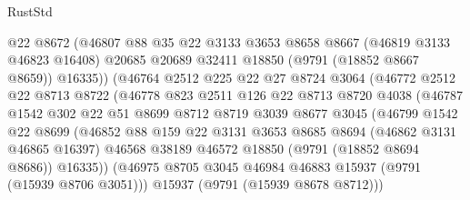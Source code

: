 \begin{lexlean}{RustStd}
\begin{coremodule}
                        @22
                        @8672
                        (@46807
                          @88
                          @35
                          @22
                          @3133
                          @3653
                          @8658
                          @8667
                          (@46819 @3133 @46823 @16408)
                          @20685
                          @20689
                          @32411
                          @18850
                          (@9791 (@18852 @8667 @8659))
                          @16335))
                      (@46764
                        @2512
                        @225
                        @22
                        @27
                        @8724
                        @3064
                        (@46772
                          @2512
                          @22
                          @8713
                          @8722
                          (@46778
                            @823
                            @2511
                            @126
                            @22
                            @8713
                            @8720
                            @4038
                            (@46787
                              @1542
                              @302
                              @22
                              @51
                              @8699
                              @8712
                              @8719
                              @3039
                              @8677
                              @3045
                              (@46799
                                @1542
                                @22
                                @8699
                                (@46852
                                  @88
                                  @159
                                  @22
                                  @3131
                                  @3653
                                  @8685
                                  @8694
                                  (@46862 @3131 @46865 @16397)
                                  @46568
                                  @38189
                                  @46572
                                  @18850
                                  (@9791 (@18852 @8694 @8686))
                                  @16335))
                              (@46975 @8705 @3045 @46984 @46883 @15937 (@9791 (@15939 @8706 @3051)))
                              @15937
                              (@9791 (@15939 @8678 @8712)))

\end{coremodule}
\end{lexlean}
